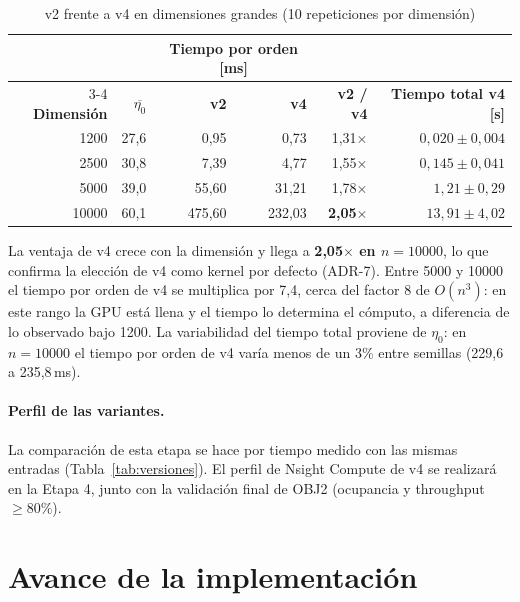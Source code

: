 \documentclass[11pt,a4paper]{article}
\begin{document}
\begin{table}[h]
\centering
\caption{v2 frente a v4 en dimensiones grandes (10 repeticiones por dimensión)}\label{tab:v2v4}
\begin{tabular}{rrrrrr}
\toprule
 & & \multicolumn{2}{c}{\textbf{Tiempo por orden [ms]}} & & \\
\cmidrule(lr){3-4}
\textbf{Dimensión} & $\overline{\eta_0}$ & \textbf{v2} & \textbf{v4} & \textbf{v2 / v4} &
\textbf{Tiempo total v4 [s]}\\
\midrule
\num{1200}  & 27,6 & 0,95   & 0,73   & 1,31$\times$ & $0{,}020 \pm 0{,}004$\\
\num{2500}  & 30,8 & 7,39   & 4,77   & 1,55$\times$ & $0{,}145 \pm 0{,}041$\\
\num{5000}  & 39,0 & 55,60  & 31,21  & 1,78$\times$ & $1{,}21 \pm 0{,}29$\\
\num{10000} & 60,1 & 475,60 & 232,03 & \textbf{2,05$\times$} & $13{,}91 \pm 4{,}02$\\
\bottomrule
\end{tabular}
\end{table}

La ventaja de v4 crece con la dimensión y llega a \textbf{2,05$\times$ en $n=\num{10000}$}, lo
que confirma la elección de v4 como kernel por defecto (ADR-7). Entre \num{5000} y \num{10000}
el tiempo por orden de v4 se multiplica por 7,4, cerca del factor 8 de $O(n^3)$: en este rango
la GPU está llena y el tiempo lo determina el cómputo, a diferencia de lo observado bajo
\num{1200}. La variabilidad del tiempo total proviene de $\eta_0$: en $n=\num{10000}$ el tiempo por orden
de v4 varía menos de un 3\% entre semillas (229,6 a 235,8\,ms).

\paragraph{Perfil de las variantes.}
La comparación de esta etapa se hace por tiempo medido con las mismas entradas
(Tabla~\ref{tab:versiones}). El perfil de Nsight Compute de v4 se realizará en la Etapa 4, junto
con la validación final de OBJ2 (ocupancia y throughput $\geq 80\%$).

\section{Avance de la implementación}\label{sec:demo}
\end{document}
